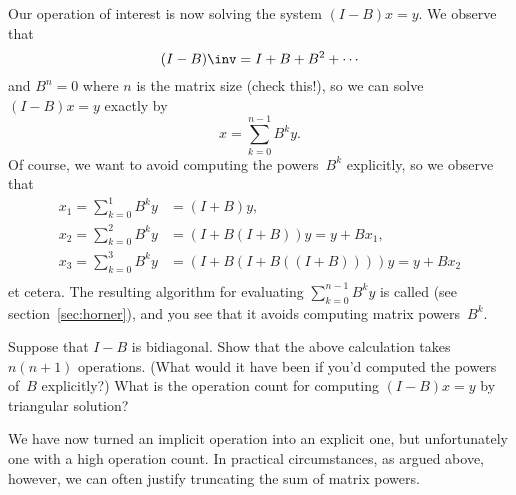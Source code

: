 Our operation of interest is now solving the system $(I-B)x=y$. We
observe that
\begin{equation}
  (I-B)\inv = I+B+B^2+\cdots
  \label{eq:neuman-series}
\end{equation}
and $B^n=0$ where $n$ is the matrix size (check
this!), so we can solve $(I-B) x = y$ exactly by 
\[ x = \sum_{k=0}^{n-1}B^k y. \]
Of course, we want to avoid computing the powers~$B^k$ explicitly, so
we observe that
\begin{equation}
  \begin{array}{rl}
    x_1=\sum_{k=0}^1B^ky &= (I+B)y,\\
    x_2=\sum_{k=0}^2B^ky &= (I+B(I+B))y = y+Bx_1,\\
    x_3=\sum_{k=0}^3B^ky &= (I+B(I+B((I+B))))y = y+Bx_2\\
  \end{array}
  \label{eq:horner}
\end{equation}
et cetera.
The resulting algorithm for evaluating $\sum_{k=0}^{n-1}B^k y$ is
called  (see section~\ref{sec:horner}),
and you see that it avoids computing
matrix powers~$B^k$.

\begin{exercise}
  Suppose that $I-B$ is bidiagonal.  Show that the above calculation
  takes $n(n+1)$ operations. (What would it have been if you'd computed
  the powers of~$B$ explicitly?)
  What is the operation count for computing
  $(I-B)x=y$ by triangular solution?
\end{exercise}

We have now turned an implicit operation into an explicit one, but
unfortunately one with a high operation count.
In practical circumstances, as argued above, however,
we can often justify truncating the sum of matrix powers.

